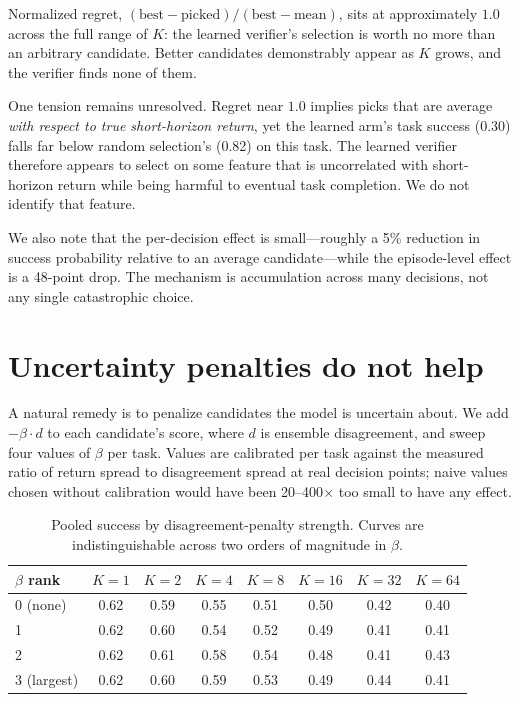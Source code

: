\documentclass[11pt]{article}
\begin{document}
Normalized regret, $(\text{best}-\text{picked})/(\text{best}-\text{mean})$, sits
at approximately $1.0$ across the full range of $K$: the learned verifier's
selection is worth no more than an arbitrary candidate. Better candidates
demonstrably appear as $K$ grows, and the verifier finds none of them.

One tension remains unresolved. Regret near $1.0$ implies picks that are average
\emph{with respect to true short-horizon return}, yet the learned arm's task
success (0.30) falls far below random selection's (0.82) on this task. The
learned verifier therefore appears to select on some feature that is
uncorrelated with short-horizon return while being harmful to eventual task
completion. We do not identify that feature.

We also note that the per-decision effect is small---roughly a 5\% reduction in
success probability relative to an average candidate---while the episode-level
effect is a 48-point drop. The mechanism is accumulation across many decisions,
not any single catastrophic choice.

\section{Uncertainty penalties do not help}

A natural remedy is to penalize candidates the model is uncertain about. We add
$-\beta \cdot d$ to each candidate's score, where $d$ is ensemble disagreement,
and sweep four values of $\beta$ per task. Values are calibrated per task
against the measured ratio of return spread to disagreement spread at real
decision points; naive values chosen without calibration would have been
20--400$\times$ too small to have any effect.

\begin{table}[t]
\centering
\small
\begin{tabular}{lccccccc}
\toprule
$\beta$ rank & $K{=}1$ & $K{=}2$ & $K{=}4$ & $K{=}8$ & $K{=}16$ & $K{=}32$ & $K{=}64$ \\
\midrule
0 (none)     & 0.62 & 0.59 & 0.55 & 0.51 & 0.50 & 0.42 & 0.40 \\
1            & 0.62 & 0.60 & 0.54 & 0.52 & 0.49 & 0.41 & 0.41 \\
2            & 0.62 & 0.61 & 0.58 & 0.54 & 0.48 & 0.41 & 0.43 \\
3 (largest)  & 0.62 & 0.60 & 0.59 & 0.53 & 0.49 & 0.44 & 0.41 \\
\bottomrule
\end{tabular}
\caption{Pooled success by disagreement-penalty strength. Curves are
indistinguishable across two orders of magnitude in $\beta$.}
\label{tab:beta}
\end{table}
\end{document}

